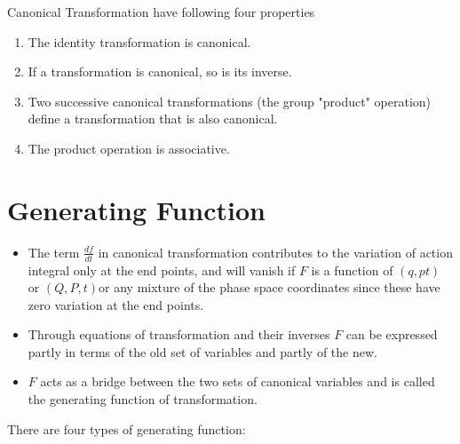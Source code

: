 Canonical Transformation have following four properties
\begin{enumerate}
	\item The identity transformation is canonical.
	\item If a transformation is canonical, so is its inverse.
	\item Two successive canonical transformations (the group "product" operation) define a transformation that is also canonical.
	\item The product operation is associative.
\end{enumerate}
\section{Generating Function}
\begin{itemize}
	\item The term $\frac{df}{dt}$ in canonical transformation contributes to the variation of action integral only at the end points, and will vanish if $F$ is a function of $(q,p t)$ or $(Q,P,t)$or any mixture of the phase space coordinates since these have zero variation at the end points.
	\item Through equations of transformation and their inverses $F$ can be expressed partly in terms of the old set of variables and partly of the new.
	\item $F$ acts as a bridge between the two sets of canonical variables and is called the generating function of transformation.
\end{itemize}
There are four types of generating function:
